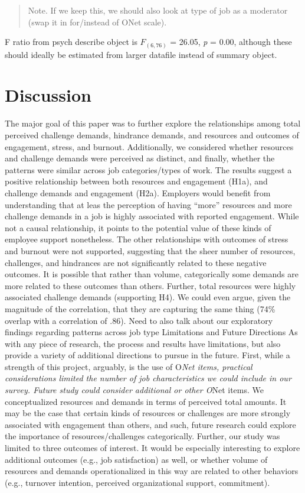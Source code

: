 \documentclass[
  man]{apa6}
\begin{document}
\begin{quote}
Note. If we keep this, we should also look at type of job as a moderator (swap it in for/instead of ONet scale).
\end{quote}

F ratio from psych describe object is \(F_(6, 76)\) = 26.05, \emph{p} = 0.00, although these should ideally be estimated from larger datafile instead of summary object.

\hypertarget{discussion}{%
\section{Discussion}\label{discussion}}

The major goal of this paper was to further explore the relationships among total perceived challenge demands, hindrance demands, and resources and outcomes of engagement, stress, and burnout. Additionally, we considered whether resources and challenge demands were perceived as distinct, and finally, whether the patterns were similar across job categories/types of work. The results suggest a positive relationship between both resources and engagement (H1a), and challenge demands and engagement (H2a). Employers would benefit from understanding that at leas the perception of having ``more'' resources and more challenge demands in a job is highly associated with reported engagement. While not a causal relationship, it points to the potential value of these kinds of employee support nonetheless. The other relationships with outcomes of stress and burnout were not supported, suggesting that the sheer number of resources, challenges, and hindrances are not significantly related to these negative outcomes. It is possible that rather than volume, categorically some demands are more related to these outcomes than others.
Further, total resources were highly associated challenge demands (supporting H4). We could even argue, given the magnitude of the correlation, that they are capturing the same thing (74\% overlap with a correlation of .86). Need to also talk about our exploratory findings regarding patterns across job type
Limitations and Future Directions
As with any piece of research, the process and results have limitations, but also provide a variety of additional directions to pursue in the future. First, while a strength of this project, arguably, is the use of O\emph{Net items, practical considerations limited the number of job characteristics we could include in our survey. Future study could consider additional or other O}Net items. We conceptualized resources and demands in terms of perceived total amounts. It may be the case that certain kinds of resources or challenges are more strongly associated with engagement than others, and such, future research could explore the importance of resources/challenges categorically. Further, our study was limited to three outcomes of interest. It would be especially interesting to explore additional outcomes (e.g., job satisfaction) as well, or whether volume of resources and demands operationalized in this way are related to other behaviors (e.g., turnover intention, perceived organizational support, commitment).
\end{document}

